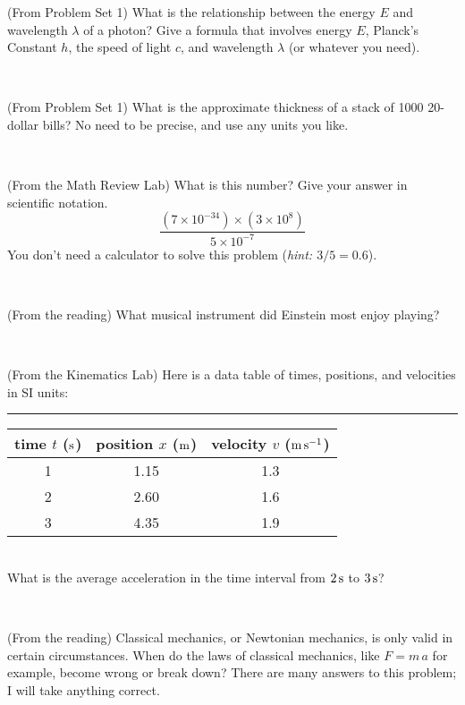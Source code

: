 \documentclass[12pt, letterpaper]{article}
\begin{document}
\begin{problem} (From Problem Set 1)
What is the relationship between the energy $E$ and wavelength
$\lambda$ of a photon? Give a formula that involves energy $E$,
Planck's Constant $h$, the speed of light $c$, and wavelength
$\lambda$ (or whatever you need).
\end{problem}

\vfill ~

\begin{problem} (From Problem Set 1)
What is the approximate thickness of a stack of 1000 20-dollar bills?
No need to be precise, and use any units you like.
\end{problem}


\vfill ~


\clearpage


\begin{problem} (From the Math Review Lab)
What is this number? Give your answer in scientific notation.
$$
\frac{(7\times10^{-34})\times(3\times10^8)}{5\times10^{-7}}
$$
You don't need a calculator to solve this problem (\textit{hint: $3/5=0.6$}).
\end{problem}


\vfill ~

\begin{problem} (From the reading)
What musical instrument did Einstein most enjoy playing?
\end{problem}


\vfill ~

\begin{problem} (From the Kinematics Lab)
Here is a data table of times, positions, and velocities in SI units:\\
\rule{1.0in}{0pt}\begin{tabular}{c|c|c}
time $t$ ($\mathrm{s}$) & position $x$ ($\mathrm{m}$) & velocity $v$ ($\mathrm{m}\,\mathrm{s}^{-1}$) \\
\hline
1 & 1.15 & 1.3 \\
2 & 2.60 & 1.6 \\
3 & 4.35 & 1.9 \\
\hline
\end{tabular}\\
What is the average acceleration in the time interval from $2\,\mathrm{s}$ to $3\,\mathrm{s}$?
\end{problem}


\vfill ~

\begin{problem} (From the reading)
Classical mechanics, or Newtonian mechanics, is only valid in certain
circumstances. When do the laws of classical mechanics, like $F =
m\,a$ for example, become wrong or break down? There are many answers
to this problem; I will take anything correct.
\end{problem}
\end{document}
